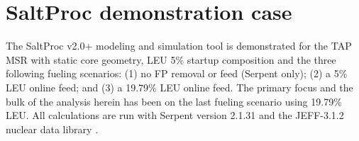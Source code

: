\documentclass[12pt]{article} %
\begin{document}
\section{SaltProc demonstration case}
The SaltProc v2.0+ modeling and simulation tool is demonstrated for the 
\gls{TAP} \gls{MSR} with static core geometry, \gls{LEU} 5\% startup 
composition  \cite{transatomic_power_corporation_neutronics_2016} and the 
three following fueling scenarios: (1) no \gls{FP} removal or feed (Serpent 
only); (2) a 5\% \gls{LEU} online feed; and (3) a 19.79\% \gls{LEU} online 
feed. The primary focus and the bulk of the analysis herein has been on the 
last fueling scenario using 19.79\% \gls{LEU}. All calculations are run with 
Serpent version 2.1.31 and the JEFF-3.1.2 nuclear data library 
\cite{leppanen_serpent_2013, oecd/nea_data_bank_jeff-3.1.2_2014}.
\end{document}
